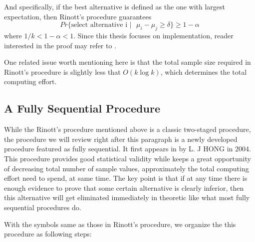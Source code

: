 \documentclass[12pt,a4]{report}
\begin{document}
And specifically, if the best alternative is defined as the one with largest expectation, then Rinott's procedure guarantees
$$ Pr\{\text{select alternative i }|\text{ }\mu_i - \mu_j \geqslant \delta \} \geqslant 1 - \alpha $$
where $1/k < 1 - \alpha < 1$. Since this thesis focuses on implementation, reader interested in the proof may refer to \cite{ras-recent-advances}. 

One related issue worth mentioning here is that the total sample size required in Rinott's procedure is slightly less that $O(k\log{k})$, which determines the total computing effort.

\subsection{A Fully Sequential Procedure}

While the Rinott's procedure mentioned above is a classic two-staged procedure, the procedure we will review right after this paragraph is a newly developed procedure featured as fully sequential. It first appears in \cite{ras-seq-jeff} by L. J HONG in 2004. This procedure provides good statistical validity while keeps a great opportunity of decreasing total number of sample values, approximately the total computing effort need to spend, at same time. The key point is that if at any time there is enough evidence to prove that some certain alternative is clearly inferior, then this alternative will get eliminated immediately in theoretic like what most fully sequential procedures do.

With the symbols same as those in Rinott's procedure, we organize the this procedure as following steps:
\end{document}
